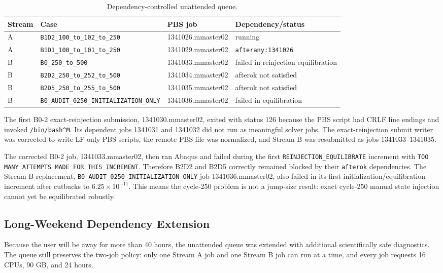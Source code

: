 \documentclass[11pt,a4paper]{article}
\newcommand{\code}[1]{\texttt{#1}}
\begin{document}
\begin{table}[H]
\centering
\caption{Dependency-controlled unattended queue.}
\begin{tabular}{llll}
\toprule
Stream & Case & PBS job & Dependency/status \\
\midrule
A & \code{B1D2\_100\_to\_102\_to\_250} & 1341026.mmaster02 & running \\
A & \code{B1D1\_100\_to\_101\_to\_250} & 1341029.mmaster02 & \code{afterany:1341026} \\
B & \code{B0\_250\_to\_500} & 1341033.mmaster02 & failed in reinjection equilibration \\
B & \code{B2D2\_250\_to\_252\_to\_500} & 1341034.mmaster02 & afterok not satisfied \\
B & \code{B2D5\_250\_to\_255\_to\_500} & 1341035.mmaster02 & afterok not satisfied \\
B & \code{B0\_AUDIT\_0250\_INITIALIZATION\_ONLY} & 1341036.mmaster02 & failed in equilibration \\
\bottomrule
\end{tabular}
\end{table}

The first B0-2 exact-reinjection submission, 1341030.mmaster02, exited with status 126 because the PBS script had CRLF line endings and invoked \code{/bin/bash\string^M}. Its dependent jobs 1341031 and 1341032 did not run as meaningful solver jobs. The exact-reinjection submit writer was corrected to write LF-only PBS scripts, the remote PBS file was normalized, and Stream B was resubmitted as jobs 1341033--1341035.

The corrected B0-2 job, 1341033.mmaster02, then ran Abaqus and failed during the first \code{REINJECTION\_EQUILIBRATE} increment with \code{TOO MANY ATTEMPTS MADE FOR THIS INCREMENT}. Therefore B2D2 and B2D5 correctly remained blocked by their \code{afterok} dependencies. The Stream B replacement, \code{B0\_AUDIT\_0250\_INITIALIZATION\_ONLY} job 1341036.mmaster02, also failed in its first initialization/equilibration increment after cutbacks to $6.25 \times 10^{-11}$. This means the cycle-250 problem is not a jump-size result: exact cycle-250 manual state injection cannot yet be equilibrated robustly.

\subsection{Long-Weekend Dependency Extension}

Because the user will be away for more than 40 hours, the unattended queue was extended with additional scientifically safe diagnostics. The queue still preserves the two-job policy: only one Stream A job and one Stream B job can run at a time, and every job requests 16 CPUs, 90 GB, and 24 hours.
\end{document}
